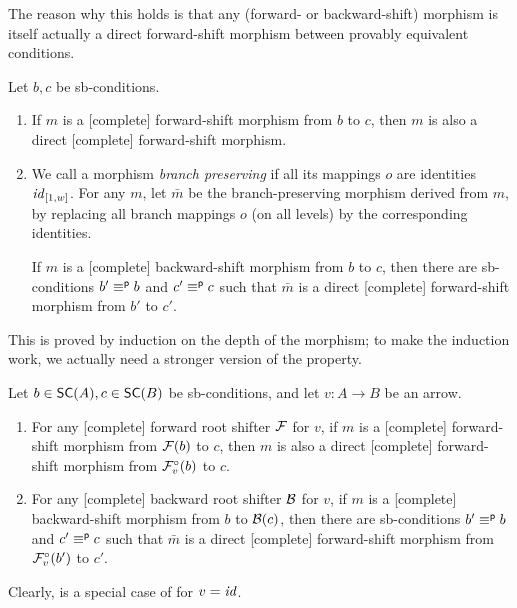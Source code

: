 %
The reason why this holds is that any (forward- or backward-shift) morphism is itself actually a direct forward-shift morphism between provably equivalent conditions.
%
\begin{proposition}
Let $b,c$ be sb-conditions.
\begin{enumerate}[topsep=\smallskipamount]
\item If $m$ is a [complete] forward-shift morphism from $b$ to $c$, then $m$ is also a direct [complete] forward-shift morphism.

\item We call a morphism \emph{branch preserving} if all its mappings $o$ are identities $\mathit{id}_{[1,w]}$. For any $m$, let $\bar m$ be the branch-preserving morphism derived from $m$, by replacing all branch mappings $o$ (on all levels) by the corresponding identities.

If $m$ is a [complete] backward-shift morphism from $b$ to $c$, then there are sb-conditions $b'\equiv^{\mathsf p} b$ and $c'\equiv^{\mathsf p} c$ such that $\bar m$ is a direct [complete] forward-shift morphism from $b'$ to $c'$.
\end{enumerate}
\end{proposition}
%
This is proved by induction on the depth of the morphism; to make the induction work, we actually need a stronger version of the property.
%
\begin{lemma}
Let $b\in \SC A,c\in \SC B$ be sb-conditions, and let $v:A\to B$ be an arrow.
\begin{enumerate}[topsep=\smallskipamount]
\item For any [complete] forward root shifter $\mathcal{F}$ for $v$, if $m$ is a [complete] forward-shift morphism from $\mathcal{F}(b)$ to $c$, then $m$ is also a direct [complete] forward-shift morphism from $\mathcal{F}^\circ_{v}(b)$ to $c$.

\item For any [complete] backward root shifter $\mathcal{B}$ for $v$, if $m$ is a [complete] backward-shift morphism from $b$ to $\mathcal{B}(c)$, then there are sb-conditions $b'\equiv^{\mathsf p} b$ and $c'\equiv^{\mathsf p} c$ such that $\bar m$ is a direct [complete] forward-shift morphism from $\mathcal{F}^\circ_{v}(b')$ to $c'$.
\end{enumerate}
\end{lemma}
%
Clearly,  is a special case of  for $v=\mathit{id}$.
%
